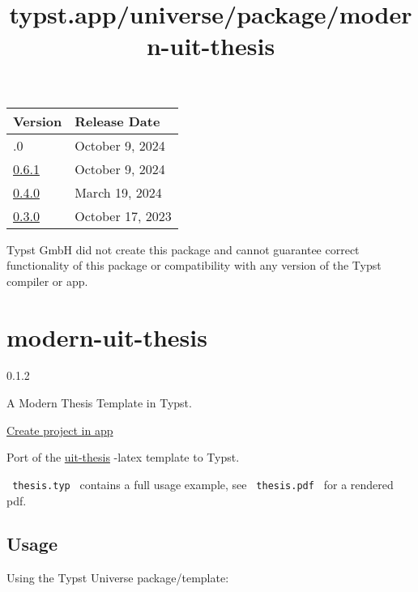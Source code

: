 \begin{longtable}[]{@{}ll@{}}
\toprule\noalign{}
Version & Release Date \\
\midrule\noalign{}
\endhead
\bottomrule\noalign{}
\endlastfoot
0.7.0 & October 9, 2024 \\
\href{https://typst.app/universe/package/tutor/0.6.1/}{0.6.1} & October
9, 2024 \\
\href{https://typst.app/universe/package/tutor/0.4.0/}{0.4.0} & March
19, 2024 \\
\href{https://typst.app/universe/package/tutor/0.3.0/}{0.3.0} & October
17, 2023 \\
\end{longtable}

Typst GmbH did not create this package and cannot guarantee correct
functionality of this package or compatibility with any version of the
Typst compiler or app.


\title{typst.app/universe/package/modern-uit-thesis}

\label{banner}
\label{template-thumbnail}

\section{modern-uit-thesis}\label{modern-uit-thesis}

{ 0.1.2 }

A Modern Thesis Template in Typst.

\href{/app?template=modern-uit-thesis&version=0.1.2}{Create project in
app}

\label{readme}
Port of the \href{https://github.com/egraff/uit-thesis}{uit-thesis}
-latex template to Typst.

\texttt{\ thesis.typ\ } contains a full usage example, see
\texttt{\ thesis.pdf\ } for a rendered pdf.

\subsection{Usage}\label{usage}

Using the Typst Universe package/template:

\begin{Shaded}
\begin{Highlighting}[]
\end{Highlighting}
\end{Shaded}

